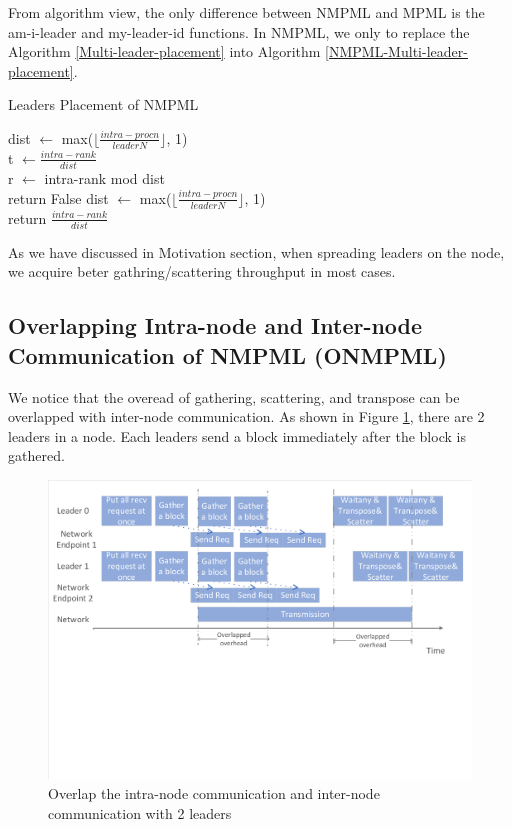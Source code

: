 From algorithm view, the only difference between NMPML and MPML is the am-i-leader and my-leader-id functions.
In NMPML, we only to replace the Algorithm \ref{Multi-leader-placement} into Algorithm \ref{NMPML-Multi-leader-placement}.
\begin{algorithm}
\caption{Leaders Placement of NMPML}\label{NMPML-Multi-leader-placement}
{
	dist $\leftarrow$  max($\lfloor \frac{intra-procn}{leaderN} \rfloor$, 1) \\
	t $\leftarrow \frac{intra-rank}{dist}$ \\
	r $\leftarrow$ intra-rank mod dist \\
	return False
}
{
	dist $\leftarrow$  max($\lfloor \frac{intra-procn}{leaderN} \rfloor$, 1) \\
	return $\frac{intra-rank}{dist}$
}
\end{algorithm}

As we have discussed in Motivation section, when spreading leaders on the node, we acquire beter gathring/scattering throughput in most cases.

\subsection{Overlapping Intra-node and Inter-node Communication of NMPML (ONMPML)}


We notice that the overead of gathering, scattering, and transpose can be overlapped with inter-node communication.
As shown in Figure \ref{fig:ONMPML}, there are 2 leaders in a node. 
Each leaders send a block immediately after the block is gathered.
\begin{figure}
\centering
\includegraphics[width=16cm]{./Figures/Overlap-inter-intra-node-communication.pdf} %
\caption{Overlap the intra-node communication and inter-node communication with 2 leaders} %
\label{fig:ONMPML}
\end{figure}

